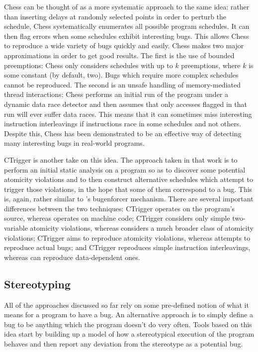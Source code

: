 Chess\cite{Musuvathi2008} can be thought of as a more systematic
approach to the same idea: rather than inserting delays at randomly
selected points in order to perturb the schedule, Chess systematically
enumerates all possible program schedules.  It can then flag errors
when some schedules exhibit interesting bugs.  This allows Chess to
reproduce a wide variety of bugs quickly and easily.  Chess makes two
major approximations in order to get good results.  The first is the
use of bounded preemptions\cite{Musuvathi2007}: Chess only considers
schedules with up to $k$ preemptions, where $k$ is some constant (by
default, two).  Bugs which require more complex schedules cannot be
reproduced.  The second is an unsafe handling of memory-mediated
thread interactions: Chess performs an initial run of the program
under a dynamic data race detector and then assumes that only accesses
flagged in that run will ever suffer data races.  This means that it
can sometimes miss interesting instruction interleavings if
instructions race in some schedules and not others.  Despite this,
Chess has been demonstrated to be an effective way of detecting many
interesting bugs in real-world programs.

CTrigger\cite{Zhou} is another take on this idea.  The approach taken
in that work is to perform an initial static analysis on a program so
as to discover some potential atomicity violations and to then
construct alternative schedules which attempt to trigger those
violations, in the hope that some of them correspond to a bug.  This
is, again, rather similar to {\technique}'s \gls{bugenforcer}
mechanism.  There are several important differences between the two
techniques: CTrigger operates on the program's source, whereas
{\technique} operates on machine code; CTrigger considers only simple
two-variable atomicity violations, whereas {\technique} considers a
much broader class of atomicity violations; CTrigger aims to reproduce
atomicity violations, whereas {\technique} attempts to reproduce
actual bugs; and CTrigger reproduces simple instruction interleavings,
whereas {\technique} can reproduce data-dependent ones.

\subsection{Stereotyping}

All of the approaches discussed so far rely on some pre-defined notion
of what it means for a program to have a bug.  An alternative approach
is to simply define a bug to be anything which the program doesn't do
very often.  Tools based on this idea start by building up a model of
how a stereotypical execution of the program behaves and then report
any deviation from the stereotype as a potential bug.

